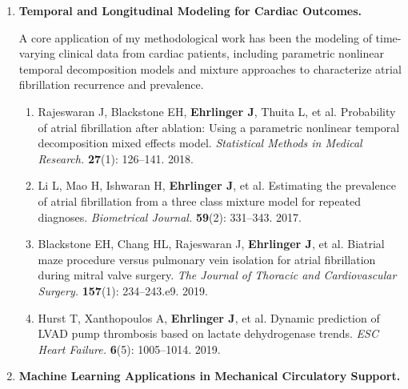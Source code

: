 \documentclass{nihbiosketch}
\begin{document}
\begin{enumerate}
\begin{enumerate}
\item \textbf{Ehrlinger J}. ggRandomForests: Visually Exploring a Random
Forest for Regression. \textit{arXiv preprint} arXiv:1501.07196 [stat.CO]. 2015.

\item \textbf{Ehrlinger J}. ggRandomForests: Exploring Random Forest
Survival. \textit{arXiv preprint} arXiv:1612.08974 [stat.CO]. 2016.
\end{enumerate}

\item \textbf{Temporal and Longitudinal Modeling for Cardiac Outcomes.}

A core application of my methodological work has been the modeling of
time-varying clinical data from cardiac patients, including parametric nonlinear
temporal decomposition models and mixture approaches to characterize atrial
fibrillation recurrence and prevalence.

\begin{enumerate}
\item Rajeswaran J, Blackstone EH, \textbf{Ehrlinger J}, Thuita L, et al.
Probability of atrial fibrillation after ablation: Using a parametric nonlinear
temporal decomposition mixed effects model. \textit{Statistical Methods in
Medical Research.} \textbf{27}(1): 126--141. 2018.

\item Li L, Mao H, Ishwaran H, \textbf{Ehrlinger J}, et al. Estimating the
prevalence of atrial fibrillation from a three class mixture model for repeated
diagnoses. \textit{Biometrical Journal.} \textbf{59}(2): 331--343. 2017.

\item Blackstone EH, Chang HL, Rajeswaran J, \textbf{Ehrlinger J}, et al.
Biatrial maze procedure versus pulmonary vein isolation for atrial fibrillation
during mitral valve surgery. \textit{The Journal of Thoracic and Cardiovascular
Surgery.} \textbf{157}(1): 234--243.e9. 2019.

\item Hurst T, Xanthopoulos A, \textbf{Ehrlinger J}, et al. Dynamic
prediction of LVAD pump thrombosis based on lactate dehydrogenase trends.
\textit{ESC Heart Failure.} \textbf{6}(5): 1005--1014. 2019.
\end{enumerate}

\item \textbf{Machine Learning Applications in Mechanical Circulatory Support.}


\end{enumerate}
\end{document}
